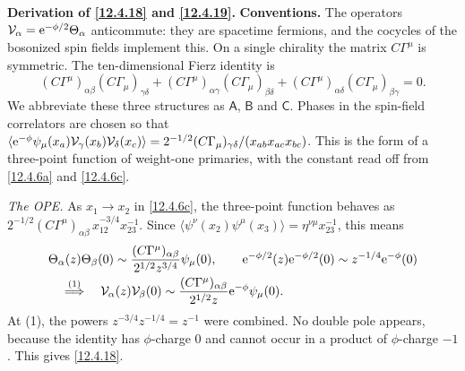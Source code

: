 \begin{tcolorbox}[breakable]
	\begin{remark}
		\textbf{Derivation of \eqref{12.4.18} and \eqref{12.4.19}.} \textbf{Conventions.} The operators $\mathcal V_{\alpha}=\mathrm{e}^{-\phi/2}\Theta_{\alpha}$ anticommute: they are spacetime fermions, and the cocycles of the bosonized spin fields implement this. On a single chirality the matrix $C\Gamma^{\mu}$ is symmetric. The ten-dimensional Fierz identity is
		\[
		(C\Gamma^{\mu})_{\alpha\beta}(C\Gamma_{\mu})_{\gamma\delta}+(C\Gamma^{\mu})_{\alpha\gamma}(C\Gamma_{\mu})_{\beta\delta}+(C\Gamma^{\mu})_{\alpha\delta}(C\Gamma_{\mu})_{\beta\gamma}=0 .
		\]
		We abbreviate these three structures as $\mathsf A$, $\mathsf B$ and $\mathsf C$. Phases in the spin-field correlators are chosen so that $\langle \mathrm{e}^{-\phi}\psi_{\mu}(x_{a})\mathcal V_{\gamma}(x_{b})\mathcal V_{\delta}(x_{c})\rangle=2^{-1/2}(C\Gamma_{\mu})_{\gamma\delta}/(x_{ab}x_{ac}x_{bc})$. This is the form of a three-point function of weight-one primaries, with the constant read off from \eqref{12.4.6a} and \eqref{12.4.6c}.

		\emph{The OPE.} As $x_{1}\to x_{2}$ in \eqref{12.4.6c}, the three-point function behaves as $2^{-1/2}(C\Gamma^{\mu})_{\alpha\beta}\,x_{12}^{-3/4}x_{23}^{-1}$. Since $\langle\psi^{\nu}(x_{2})\psi^{\mu}(x_{3})\rangle=\eta^{\nu\mu}x_{23}^{-1}$, this means
		\begin{align*}
			&\Theta_{\alpha}(z)\Theta_{\beta}(0)\sim\frac{(C\Gamma^{\mu})_{\alpha\beta}}{2^{1/2}z^{3/4}}\psi_{\mu}(0),\qquad
			\mathrm{e}^{-\phi/2}(z)\mathrm{e}^{-\phi/2}(0)\sim z^{-1/4}\mathrm{e}^{-\phi}(0)\\
			&\quad\overset{(1)}{\Longrightarrow}\quad \mathcal V_{\alpha}(z)\mathcal V_{\beta}(0)\sim\frac{(C\Gamma^{\mu})_{\alpha\beta}}{2^{1/2}z}\mathrm{e}^{-\phi}\psi_{\mu}(0) .
		\end{align*}
		At (1), the powers $z^{-3/4}z^{-1/4}=z^{-1}$ were combined. No double pole appears, because the identity has $\phi$-charge $0$ and cannot occur in a product of $\phi$-charge $-1$. This gives \eqref{12.4.18}.


\end{remark}
\end{tcolorbox}

